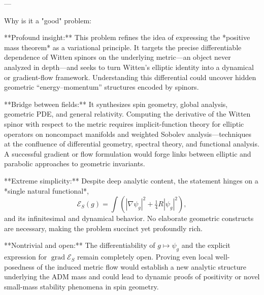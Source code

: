---

Why is it a "good" problem:  

**Profound insight:**  
This problem refines the idea of expressing the *positive mass theorem* as a variational principle.  It targets the precise differentiable dependence of Witten spinors on the underlying metric—an object never analyzed in depth—and seeks to turn Witten’s elliptic identity into a dynamical or gradient-flow framework.  Understanding this differential could uncover hidden geometric “energy–momentum” structures encoded by spinors.

**Bridge between fields:**  
It synthesizes spin geometry, global analysis, geometric PDE, and general relativity. Computing the derivative of the Witten spinor with respect to the metric requires implicit-function theory for elliptic operators on noncompact manifolds and weighted Sobolev analysis—techniques at the confluence of differential geometry, spectral theory, and functional analysis. A successful gradient or flow formulation would forge links between elliptic and parabolic approaches to geometric invariants.

**Extreme simplicity:**  
Despite deep analytic content, the statement hinges on a *single natural functional*,
\[
\mathcal{E}_S(g)=\int (|\nabla\psi_g|^2+\tfrac14 R|\psi_g|^2),
\]
and its infinitesimal and dynamical behavior. No elaborate geometric constructs are necessary, making the problem succinct yet profoundly rich.

**Nontrivial and open:**  
The differentiability of \(g\mapsto \psi_g\) and the explicit expression for \(\operatorname{grad}\mathcal{E}_S\) remain completely open. Proving even local well-posedness of the induced metric flow would establish a new analytic structure underlying the ADM mass and could lead to dynamic proofs of positivity or novel small-mass stability phenomena in spin geometry.
